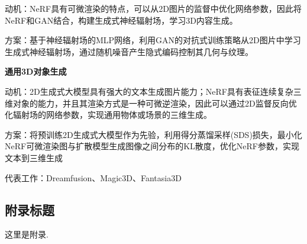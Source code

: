 \documentclass[12pt, a4paper, oneside]{ctexart}
\begin{document}
    动机：NeRF具有可微渲染的特点，可以从2D图片的监督中优化网络参数，因此将NeRF和GAN结合，构建生成式神经辐射场，学习3D内容生成。

    方案：基于神经辐射场的MLP网络，利用GAN的对抗式训练策略从2D图片中学习生成式神经辐射场，通过随机噪音产生隐式编码控制其几何与纹理。

    \noindent\textbf{通用3D对象生成}

    动机：2D生成式大模型具有强大的文本生成图片能力；NeRF具有表征连续复杂三维对象的能力，并且其渲染方式是一种可微逆渲染，因此可以通过2D监督反向优化辐射场的网络参数，实现通用物体或场景的三维生成。

    方案：将预训练2D生成式大模型作为先验，利用得分蒸馏采样(SDS)损失，最小化NeRF可微渲染图与扩散模型生成图像之间分布的KL散度，优化NeRF参数，实现文本到三维生成

    代表工作：Dreamfusion、Magic3D、Fantasia3D


    \newpage
    
    

    \newpage

    \begin{appendices}
        \renewcommand{\thesection}{\Alph{section}}
        \section{附录标题}
        这里是附录.
    \end{appendices}
\end{document}
